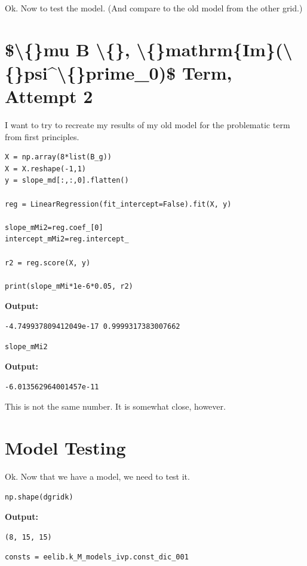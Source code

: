 \documentclass{article}
\begin{document}
Ok. Now to test the model. (And compare to the old model from the other grid.)

\section{\$\textbackslash\{\}mu B \textbackslash\{\}, \textbackslash\{\}mathrm\{Im\}(\textbackslash\{\}psi\textasciicircum{}\textbackslash\{\}prime\_0)\$ Term, Attempt 2}

I want to try to recreate my results of my old model for the problematic term from first principles.

\begin{lstlisting}
X = np.array(8*list(B_g))
X = X.reshape(-1,1)
y = slope_md[:,:,0].flatten()

reg = LinearRegression(fit_intercept=False).fit(X, y)

slope_mMi2=reg.coef_[0]
intercept_mMi2=reg.intercept_

r2 = reg.score(X, y)

print(slope_mMi*1e-6*0.05, r2)\end{lstlisting}

\textbf{Output:}\begin{verbatim}
-4.749937809412049e-17 0.9999317383007662

\end{verbatim}

\begin{lstlisting}
slope_mMi2\end{lstlisting}

\textbf{Output:}\begin{verbatim}
-6.013562964001457e-11
\end{verbatim}

This is not the same number. It is somewhat close, however.

\section{Model Testing}

Ok. Now that we have a model, we need to test it.

\begin{lstlisting}
np.shape(dgridk)\end{lstlisting}

\textbf{Output:}\begin{verbatim}
(8, 15, 15)
\end{verbatim}

\begin{lstlisting}
consts = eelib.k_M_models_ivp.const_dic_001\end{lstlisting}
\end{document}
